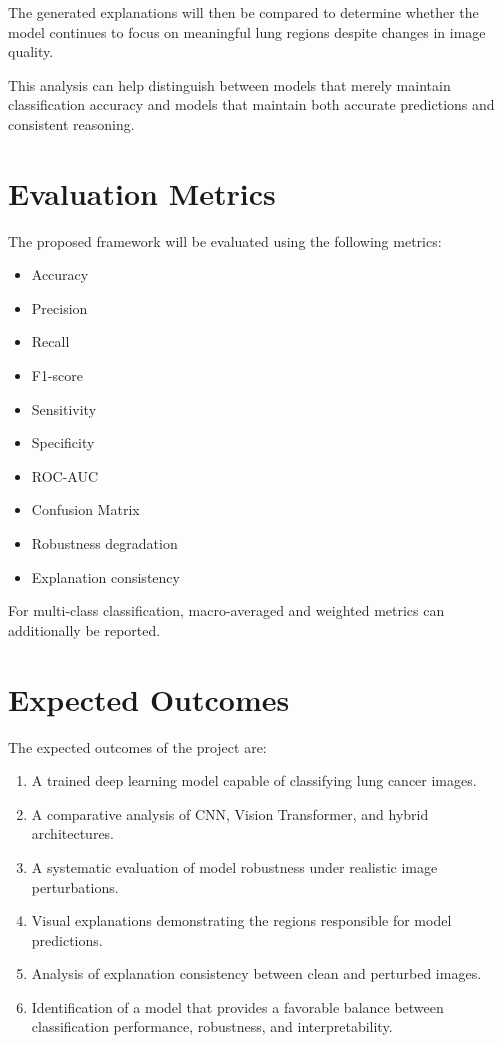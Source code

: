 \documentclass[12pt,a4paper]{article}
\begin{document}
The generated explanations will then be compared to determine whether the model continues to focus on meaningful lung regions despite changes in image quality.

This analysis can help distinguish between models that merely maintain classification accuracy and models that maintain both accurate predictions and consistent reasoning.

\section{Evaluation Metrics}

The proposed framework will be evaluated using the following metrics:

\begin{itemize}
    \item Accuracy
    \item Precision
    \item Recall
    \item F1-score
    \item Sensitivity
    \item Specificity
    \item ROC-AUC
    \item Confusion Matrix
    \item Robustness degradation
    \item Explanation consistency
\end{itemize}

For multi-class classification, macro-averaged and weighted metrics can additionally be reported.

\section{Expected Outcomes}

The expected outcomes of the project are:

\begin{enumerate}
    \item A trained deep learning model capable of classifying lung cancer images.
    \item A comparative analysis of CNN, Vision Transformer, and hybrid architectures.
    \item A systematic evaluation of model robustness under realistic image perturbations.
    \item Visual explanations demonstrating the regions responsible for model predictions.
    \item Analysis of explanation consistency between clean and perturbed images.
    \item Identification of a model that provides a favorable balance between classification performance, robustness, and interpretability.
\end{enumerate}
\end{document}
